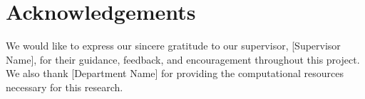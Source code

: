 \chapter*{Acknowledgements}


We would like to express our sincere gratitude to our supervisor, [Supervisor Name], for
their guidance, feedback, and encouragement throughout this project. We also thank
[Department Name] for providing the computational resources necessary for this research.
